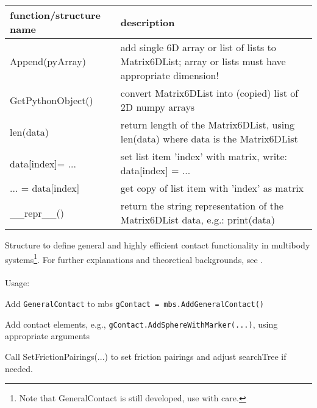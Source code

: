 \begin{center}
\footnotesize
\begin{longtable}{| p{8cm} | p{8cm} |} 
\hline
{\bf function/structure name} & {\bf description}\\ \hline
  Append(pyArray) & add single 6D array or list of lists to Matrix6DList; array or lists must have appropriate dimension!\\ \hline 
  GetPythonObject() & convert Matrix6DList into (copied) list of 2D numpy arrays\\ \hline 
  len(data) & return length of the Matrix6DList, using len(data) where data is the Matrix6DList\\ \hline 
  data[index]= ... & set list item 'index' with matrix, write: data[index] = ...\\ \hline 
  ... = data[index] & get copy of list item with 'index' as matrix\\ \hline 
  \_\_repr\_\_() & return the string representation of the Matrix6DList data, e.g.: print(data)\\ \hline 
\end{longtable}
\end{center}

\label{sec:GeneralContact}Structure to define general and highly efficient contact functionality in multibody systems\footnote{Note that GeneralContact is still developed, use with care.}. For further explanations and theoretical backgrounds, see . \\ \\ Usage: \bi
  \item Add \texttt{GeneralContact} to mbs \texttt{gContact = mbs.AddGeneralContact()} 
  \item Add contact elements, e.g., \texttt{gContact.AddSphereWithMarker(...)}, using appropriate arguments 
  \item Call SetFrictionPairings(...) to set friction pairings and adjust searchTree if needed.
\ei


